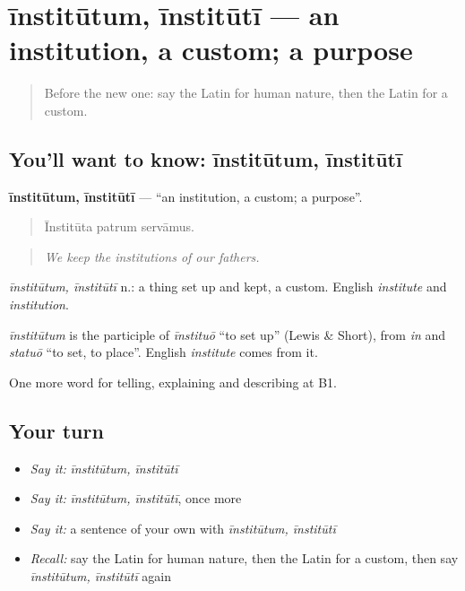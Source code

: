 \section[īnstitūtum, īnstitūtī]{īnstitūtum, īnstitūtī — an institution, a custom; a purpose}

\label{lesson:LA-C386-institutum}



\begin{quote}
Before the new one: say the Latin for human nature, then the Latin for a custom.
\end{quote}

\subsection*{You'll want to know: īnstitūtum, īnstitūtī}
\textbf{īnstitūtum, īnstitūtī} — \textquotedblleft{}an institution, a custom; a purpose\textquotedblright{}.

\begin{quote}
Īnstitūta patrum servāmus.
\end{quote}

\begin{quote}
\emph{We keep the institutions of our fathers.}
\end{quote}

\emph{īnstitūtum, īnstitūtī} n.: a thing set up and kept, a custom. English \emph{institute} and \emph{institution}.

\begin{cousinweb}
\emph{īnstitūtum} is the participle of \emph{īnstituō} \textquotedblleft{}to set up\textquotedblright{} (Lewis \& Short), from \emph{in} and \emph{statuō} \textquotedblleft{}to set, to place\textquotedblright{}. English \emph{institute} comes from it.
\end{cousinweb}

\begin{grammarlens}[title={What you've built}]
One more word for telling, explaining and describing at B1.
\end{grammarlens}

\subsection*{Your turn}
\begin{itemize}
\raggedright
  \item \emph{Say it:} \emph{īnstitūtum, īnstitūtī}
  \item \emph{Say it:} \emph{īnstitūtum, īnstitūtī}, once more
  \item \emph{Say it:} a sentence of your own with \emph{īnstitūtum, īnstitūtī}
  \item \emph{Recall:} say the Latin for human nature, then the Latin for a custom, then say \emph{īnstitūtum, īnstitūtī} again
\end{itemize}


